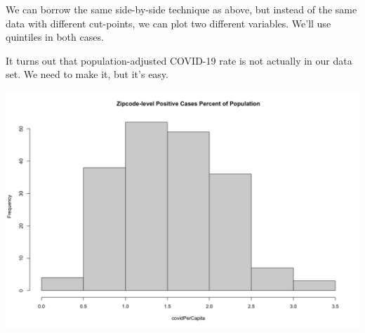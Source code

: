 \documentclass[
  openany]{book}
\newenvironment{Shaded}{\begin{snugshade}}{\end{snugshade}}
\newcommand{\AttributeTok}[1]{\textcolor[rgb]{0.77,0.63,0.00}{#1}}
\newcommand{\DecValTok}[1]{\textcolor[rgb]{0.00,0.00,0.81}{#1}}
\newcommand{\FunctionTok}[1]{\textcolor[rgb]{0.00,0.00,0.00}{#1}}
\newcommand{\NormalTok}[1]{#1}
\newcommand{\OtherTok}[1]{\textcolor[rgb]{0.56,0.35,0.01}{#1}}
\newcommand{\SpecialCharTok}[1]{\textcolor[rgb]{0.00,0.00,0.00}{#1}}
\newcommand{\StringTok}[1]{\textcolor[rgb]{0.31,0.60,0.02}{#1}}
\begin{document}
We can borrow the same side-by-side technique as above, but instead of the same data with different cut-points, we can plot two different variables. We'll use quintiles in both cases.

It turns out that population-adjusted COVID-19 rate is not actually in our data set. We need to make it, but it's easy.

\begin{Shaded}
\end{Shaded}

\begin{center}\includegraphics[width=0.9\linewidth]{carpedatum_files/figure-html/unnamed-chunk-94-1} \end{center}
\end{document}
